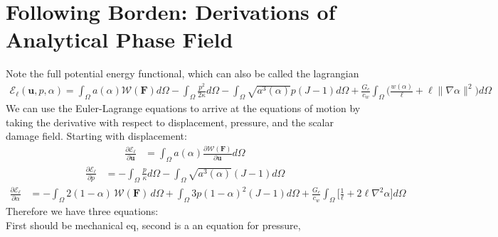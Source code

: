 \documentclass[12pt,3p]{article}
\numberwithin{equation}{section}
\begin{document}
\section{Following Borden: Derivations of Analytical Phase Field}
Note the full potential energy functional, which can also be called the lagrangian
\begin{align*}
\mathcal{E}_{\ell} (\boldsymbol{u}, p, \alpha) = \int_{\Omega} a(\alpha) \mathcal{W}(\mathbf{F}) d \Omega - \int_{\Omega} \frac{p^{2}}{2 \kappa} d \Omega - \int_{\Omega} \sqrt{a^{3}(\alpha)} p(J-1) d \Omega + \frac{G_{c}}{c_{w}} \int_{\Omega} \bigg(\frac{w(\alpha)}{\ell}+\ell\|\nabla \alpha\|^{2} \bigg) d \Omega
\end{align*}
We can use the Euler-Lagrange equations to arrive at the equations of motion by taking the derivative with respect to displacement, pressure, and the scalar damage field. Starting with displacement:
\begin{align*}
\frac{\partial \mathcal{E}_{\ell}}{\partial \boldsymbol{u}} &= \int_{\Omega} a (\alpha) \frac{\partial \mathcal{W} (\mathbf{F})}{\partial \mathbf{u}} d \Omega 
\end{align*}
\begin{align*}
\frac{\partial \mathcal{E}_{\ell}}{\partial p} &= - \int_{\Omega} \frac{p}{\kappa} d \Omega - \int_{\Omega} \sqrt{a^3(\alpha)} (J-1) d \Omega
\end{align*}
\begin{align*}
\frac{\partial \mathcal{E}_{\ell}}{\partial \alpha} &= - \int_{\Omega} 2 (1 - \alpha) \, \mathcal{W} (\mathbf{F}) \, d \Omega + \int_{\Omega} 3 p (1- \alpha)^2 (J-1) d \Omega + \frac{G_{c}}{c_{w}} \int_{\Omega} \bigg[ \frac{1}{\ell} + 2 \ell \nabla^2 \alpha \bigg] d \Omega 
\end{align*}
Therefore we have three equations: \\
First should be mechanical eq, second is a an equation for pressure, 
\end{document}

